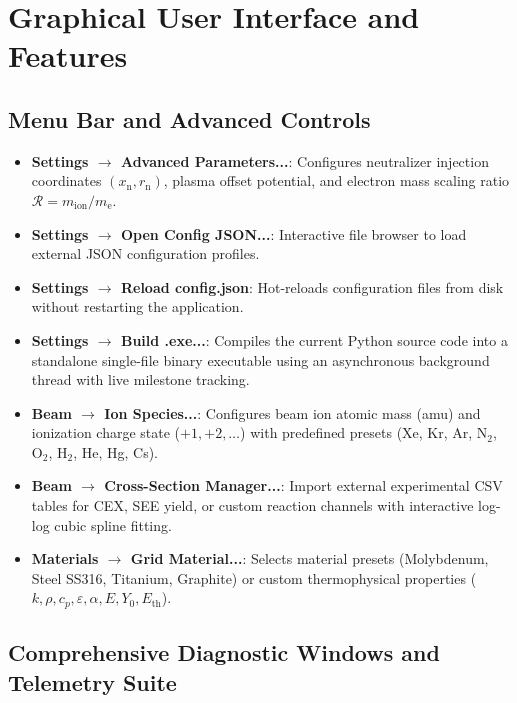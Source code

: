\documentclass[11pt,a4paper]{article}
\begin{document}
\section{Graphical User Interface and Features}

\subsection{Menu Bar and Advanced Controls}

\begin{itemize}
    \item \textbf{Settings $\rightarrow$ Advanced Parameters...}: Configures neutralizer injection coordinates $(x_{\mathrm{n}}, r_{\mathrm{n}})$, plasma offset potential, and electron mass scaling ratio $\mathcal{R} = m_{\mathrm{ion}}/m_{\mathrm{e}}$.
    \item \textbf{Settings $\rightarrow$ Open Config JSON...}: Interactive file browser to load external JSON configuration profiles.
    \item \textbf{Settings $\rightarrow$ Reload config.json}: Hot-reloads configuration files from disk without restarting the application.
    \item \textbf{Settings $\rightarrow$ Build .exe...}: Compiles the current Python source code into a standalone single-file binary executable using an asynchronous background thread with live milestone tracking.
    \item \textbf{Beam $\rightarrow$ Ion Species...}: Configures beam ion atomic mass (amu) and ionization charge state ($+1, +2, \dots$) with predefined presets (Xe, Kr, Ar, N$_2$, O$_2$, H$_2$, He, Hg, Cs).
    \item \textbf{Beam $\rightarrow$ Cross-Section Manager...}: Import external experimental CSV tables for CEX, SEE yield, or custom reaction channels with interactive log-log cubic spline fitting.
    \item \textbf{Materials $\rightarrow$ Grid Material...}: Selects material presets (Molybdenum, Steel SS316, Titanium, Graphite) or custom thermophysical properties ($k, \rho, c_p, \varepsilon, \alpha, E, Y_0, E_{\mathrm{th}}$).
\end{itemize}

\subsection{Comprehensive Diagnostic Windows and Telemetry Suite}
\end{document}
